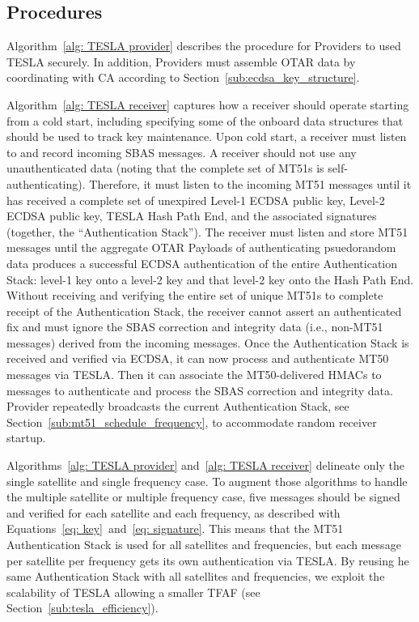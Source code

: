 \documentclass[letterpaper,times]{IONconf/IONconf}
\begin{document}
	\subsection{Procedures} \label{sub:procedures}

		Algorithm~\ref{alg: TESLA provider} describes the procedure for Providers to used TESLA securely.
		In addition, Providers must assemble OTAR data by coordinating with CA according to Section~\ref{sub:ecdsa_key_structure}.

		Algorithm~\ref{alg: TESLA receiver} captures how a receiver should operate starting from a cold start, including specifying some of the onboard data structures that should be used to track key maintenance.
		Upon cold start, a receiver must listen to and record incoming SBAS messages.
		A receiver should not use any unauthenticated data (noting that the complete set of MT51s is self-authenticating).
		Therefore, it must listen to the incoming MT51 messages until it has received a complete set of unexpired Level-1 ECDSA public key, Level-2 ECDSA public key, TESLA Hash Path End, and the associated signatures (together, the ``Authentication Stack'').
		The receiver must listen and store MT51 messages until the aggregate OTAR Payloads of  authenticating psuedorandom data produces a successful ECDSA authentication of the entire Authentication Stack: level-1 key onto a level-2 key and that level-2 key onto the Hash Path End.
		Without receiving and verifying the entire set of unique MT51s to complete receipt of the Authentication Stack, the receiver cannot assert an authenticated fix and must ignore the SBAS correction and integrity data (i.e., non-MT51 messages) derived from the incoming messages.
		Once the Authentication Stack is received and verified via ECDSA, it can now process and authenticate MT50 messages via TESLA.
		Then it can associate the MT50-delivered HMACs to messages to authenticate and process the SBAS correction and integrity data.
		Provider repeatedly broadcasts the current Authentication Stack, see Section~\ref{sub:mt51_schedule_frequency}, to accommodate random receiver startup.

		Algorithms~\ref{alg: TESLA provider} and~\ref{alg: TESLA receiver} delineate only the single satellite and single frequency case.
		To augment those algorithms to handle the multiple satellite or multiple frequency case, five messages should be signed and verified for each satellite and each frequency, as described with Equations~\eqref{eq: key}~and~\eqref{eq: signature}.
		This means that the MT51 Authentication Stack is used for all satellites and frequencies, but each message per satellite per frequency gets its own authentication via TESLA.
		By reusing he same Authentication Stack with all satellites and frequencies, we exploit the scalability of TESLA allowing a smaller TFAF (see Section~\ref{sub:tesla_efficiency}).
\end{document}

